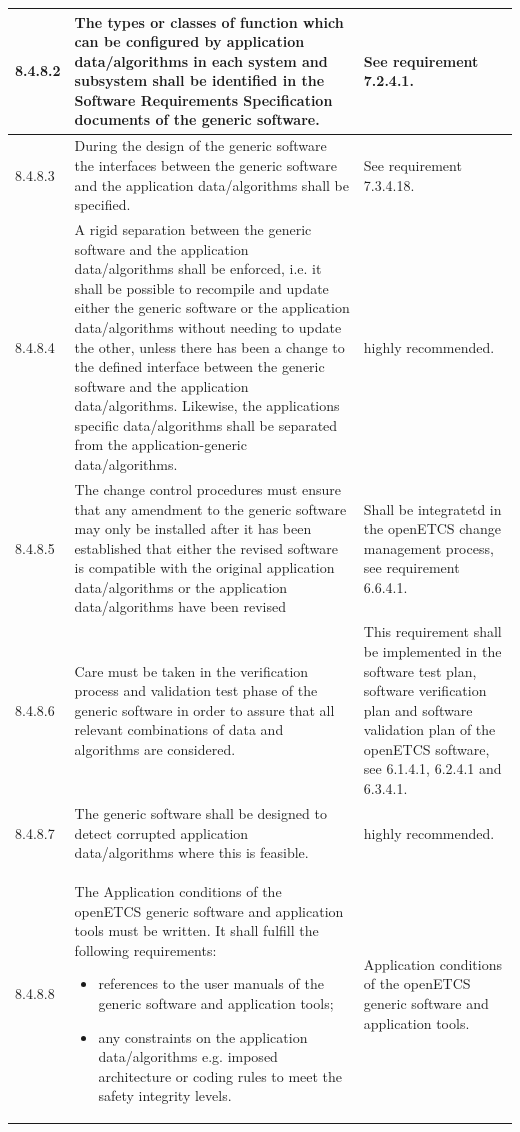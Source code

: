 \documentclass{template/openetcs_report}
\begin{document}
{\begin{longtable}{|p{2cm}|p{9cm}|p{3cm}|}
8.4.8.2 & The types or classes of function which can be configured by application data/algorithms in each system and subsystem shall be identified in the Software Requirements Specification documents of the generic software. & See requirement 7.2.4.1.\\ 
\hline
8.4.8.3 & During the design of the generic software the interfaces between the generic software and the application data/algorithms shall be specified. & See requirement 7.3.4.18.\\ 
\hline
8.4.8.4 & A rigid separation between the generic software and the application data/algorithms shall be enforced, i.e. it shall be possible to recompile and update either the generic software or the application data/algorithms without needing to update the other, unless there has been a change to the defined interface between the generic software and the application data/algorithms. Likewise, the applications specific data/algorithms shall be separated from the application-generic data/algorithms.  & highly recommended.\\ 
\hline
8.4.8.5 & The change control procedures must ensure that any amendment to the generic software may only be installed after it has been established that either the revised software is compatible with the original application data/algorithms or the application data/algorithms have been revised & Shall be integratetd in the openETCS change management process, see requirement 6.6.4.1.\\ 
\hline
8.4.8.6 & Care must be taken in the verification process and validation test phase of the generic software in order to assure that all relevant combinations of data and algorithms are considered. & This requirement shall be implemented in the software test plan, software verification plan and software validation plan of the openETCS software, see 6.1.4.1, 6.2.4.1 and  6.3.4.1.\\ 
\hline
8.4.8.7 & The generic software shall be designed to detect corrupted application data/algorithms where this is feasible. & highly recommended.\\ 
\hline
8.4.8.8 & The Application conditions of the openETCS generic software and application tools must be written.
It shall fulfill the following requirements:
\begin{itemize}\itemsep=0pt
  \item references to the user manuals of the generic software and application tools;
  \item any constraints on the application data/algorithms e.g. imposed architecture or coding rules to meet the safety integrity levels. 
\end{itemize}
& Application conditions of the openETCS generic software and application tools.\\ 
\hline
\end{longtable}}
\end{document}
